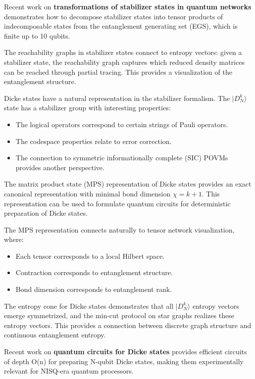 \documentclass[12pt,a4paper]{article}
\begin{document}
Recent work on \textbf{transformations of stabilizer states in quantum networks} demonstrates how to decompose stabilizer states into tensor products of indecomposable states from the entanglement generating set (EGS), which is finite up to 10 qubits.

The reachability graphs in stabilizer states connect to entropy vectors: given a stabilizer state, the reachability graph captures which reduced density matrices can be reached through partial tracing. This provides a visualization of the entanglement structure.

Dicke states have a natural representation in the stabilizer formalism. The $|D_N^k\rangle$ state has a stabilizer group with interesting properties:
\begin{itemize}
	\item The logical operators correspond to certain strings of Pauli operators.
	\item The codespace properties relate to error correction.
	\item The connection to symmetric informationally complete (SIC) POVMs provides another perspective.
\end{itemize}

The matrix product state (MPS) representation of Dicke states provides an exact canonical representation with minimal bond dimension $\chi = k+1$. This representation can be used to formulate quantum circuits for deterministic preparation of Dicke states.

The MPS representation connects naturally to tensor network visualization, where:
\begin{itemize}
	\item Each tensor corresponds to a local Hilbert space.
	\item Contraction corresponds to entanglement structure.
	\item Bond dimension corresponds to entanglement rank.
\end{itemize}

The entropy cone for Dicke states demonstrates that all $|D_N^k\rangle$ entropy vectors emerge symmetrized, and the min-cut protocol on star graphs realizes these entropy vectors. This provides a connection between discrete graph structure and continuous entanglement entropy.

Recent work on \textbf{quantum circuits for Dicke states} provides efficient circuits of depth O(n) for preparing N-qubit Dicke states, making them experimentally relevant for NISQ-era quantum processors.
\end{document}
